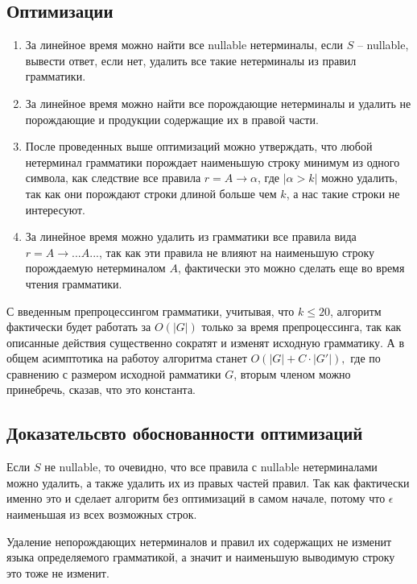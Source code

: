 \documentclass[12pt]{article}
\begin{document}
\subsection{Оптимизации}
\begin{enumerate}
    \item За линейное время можно найти все nullable нетерминалы,
          если $ S $ -- nullable, вывести ответ, если нет, удалить
          все такие нетерминалы из правил грамматики.
    \item За линейное время можно найти все порождающие нетерминалы
          и удалить не порождающие и продукции содержащие их в правой части.
    \item После проведенных выше оптимизаций можно утверждать, что любой
          нетерминал грамматики порождает наименьшую строку минимум из
          одного символа, как следствие
          все правила $ r = A \rightarrow \alpha $, где $ |\alpha > k | $
          можно удалить, так как они порождают строки длиной больше чем
          $ k $, а нас такие строки не интересуют.
    \item За линейное время можно удалить из грамматики все правила вида
          $ r = A \rightarrow ... A ... $, так как эти правила не влияют
          на наименьшую строку порождаемую нетерминалом $ A $, фактически
          это можно сделать еще во время чтения грамматики.
\end{enumerate}

С введенным препроцессингом грамматики, учитывая, что $ k \le 20 $, алгоритм
фактически будет работать за $ O(|G|) $ только за время препроцессинга,
так как описанные действия существенно сократят и изменят исходную
грамматику. А в общем асимптотика на работоу алгоритма станет
$ O(|G| + C \cdot |G'|), $ где по сравнению с размером исходной
рамматики $ G $, вторым членом можно принебречь, сказав, что это константа.

\subsection{Доказательсвто обоснованности оптимизаций}
Если $ S $ не nullable, то очевидно, что все правила с nullable
нетерминалами можно удалить, а также удалить их из правых частей правил.
Так как фактически именно это и сделает алгоритм без оптимизаций в самом
начале, потому что $ \epsilon $ наименьшая из всех возможных строк.

Удаление непорождающих нетерминалов и правил их содержащих не изменит языка
определяемого грамматикой, а значит и наименьшую выводимую строку это
тоже не изменит.
\end{document}
